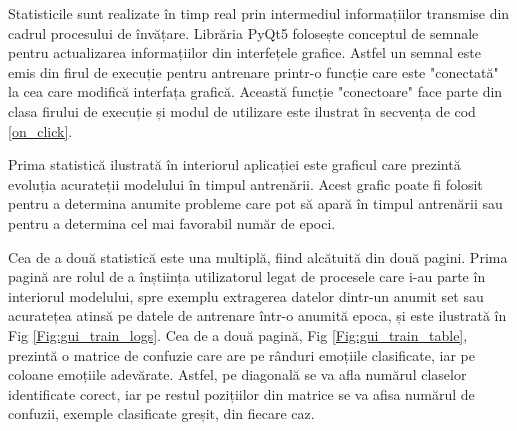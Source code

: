 \documentclass[a4paper,12pt]{book}
\begin{document}
		Statisticile sunt realizate în timp real prin intermediul informațiilor transmise din cadrul procesului de învățare. Librăria PyQt5 folosește conceptul de semnale pentru actualizarea informațiilor din interfețele grafice. Astfel un semnal este emis din firul de execuție pentru antrenare printr-o funcție care este "conectată" la cea care modifică interfața grafică. Această funcție "conectoare" face parte din clasa firului de execuție și modul de utilizare este ilustrat în secvența de cod \ref{on_click}. \par
		Prima statistică ilustrată în interiorul aplicației este graficul care prezintă evoluția acurateții modelului în timpul antrenării. Acest grafic poate fi folosit pentru a determina anumite probleme care pot să apară în timpul antrenării sau pentru a determina cel mai favorabil număr de epoci. \par
		Cea de a două statistică este una multiplă, fiind alcătuită din două pagini. Prima pagină are rolul de a înștiința utilizatorul legat de procesele care i-au parte în interiorul modelului, spre exemplu extragerea datelor dintr-un anumit set sau acuratețea atinsă pe datele de antrenare într-o anumită epoca, și este ilustrată în Fig \ref{Fig:gui_train_logs}. Cea de a două pagină, Fig \ref{Fig:gui_train_table}, prezintă o matrice de confuzie care are pe rânduri emoțiile clasificate, iar pe coloane emoțiile adevărate. Astfel, pe diagonală se va afla numărul claselor identificate corect, iar pe restul pozițiilor din matrice se va afisa numărul de confuzii, exemple clasificate greșit, din fiecare caz. 
\end{document}

